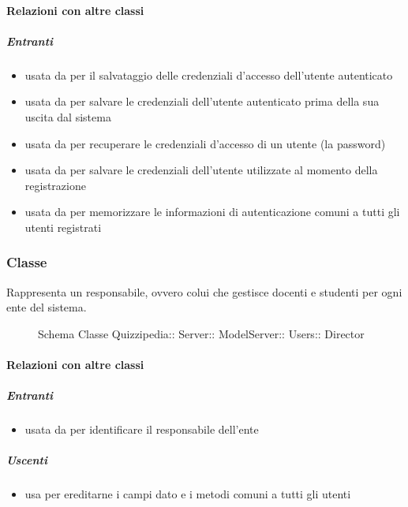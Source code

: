 \paragraph{Relazioni con altre classi}
\subparagraph{Entranti}
\begin{itemize}
\item usata da  per il salvataggio delle credenziali d'accesso dell'utente autenticato
\item usata da  per salvare le credenziali dell'utente autenticato prima della sua uscita dal sistema
\item usata da  per recuperare le credenziali d'accesso di un utente (la password)
\item usata da  per salvare le credenziali dell'utente utilizzate al momento della registrazione
\item usata da  per memorizzare le informazioni di autenticazione comuni a tutti gli utenti registrati
\end{itemize}
\subsubsection{Classe }
Rappresenta un responsabile, ovvero colui che gestisce docenti e studenti per ogni ente del sistema.
\begin{figure}[H]
\centering
\noindent{}
\caption[Schema Classe Director]{Schema Classe Quizzipedia:: Server:: ModelServer:: Users:: Director}
\end{figure}
\paragraph{Relazioni con altre classi}
\subparagraph{Entranti}
\begin{itemize}
\item usata da  per identificare il responsabile dell'ente
\end{itemize}
\subparagraph{Uscenti}
\begin{itemize}
\item usa  per ereditarne i campi dato e i metodi comuni a tutti gli utenti
\end{itemize}
